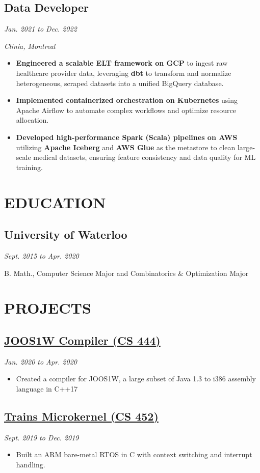 \documentclass[12pt]{extarticle}
\begin{document}
\subsection*{Data Developer} \hfill \textit{Jan. 2021 to Dec. 2022}

\textit{Clinia, Montreal}
\begin{itemize}
    \item \textbf{Engineered a scalable ELT framework on GCP} to ingest raw healthcare provider data, leveraging \textbf{dbt} to transform and normalize heterogeneous, scraped datasets into a unified BigQuery database.
    \item \textbf{Implemented containerized orchestration on Kubernetes} using Apache Airflow to automate complex workflows and optimize resource allocation.
    \item \textbf{Developed high-performance Spark (Scala) pipelines on AWS} utilizing \textbf{Apache Iceberg} and \textbf{AWS Glue} as the metastore to clean large-scale medical datasets, ensuring feature consistency and data quality for ML training.
\end{itemize}


\section*{EDUCATION}
\subsection*{University of Waterloo} \hfill \textit{Sept. 2015 to Apr. 2020}

B. Math., Computer Science Major and Combinatorics \& Optimization Major


\section*{PROJECTS}
\subsection*{\href{https://github.com/cgwelcome/SLC}{JOOS1W Compiler (CS 444)}
} \hfill \textit{Jan. 2020 to Apr. 2020}
\begin{itemize}
  \item Created a compiler for JOOS1W, a large subset of Java 1.3 to i386 assembly language in C++17
\end{itemize}

\subsection*{\href{https://github.com/cgwelcome/train-microkernel}{Trains Microkernel (CS 452)}} \hfill \textit{Sept. 2019 to Dec. 2019}
\begin{itemize}
  \item Built an ARM bare-metal RTOS in C with context switching and interrupt handling.
\end{itemize}
\end{document}
